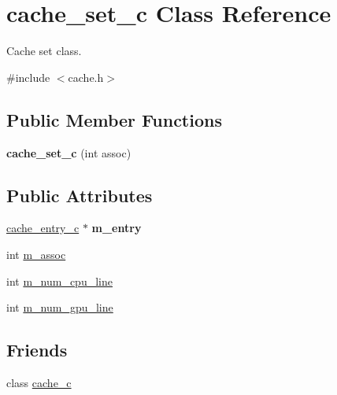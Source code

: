\hypertarget{classcache__set__c}{
\section{cache\_\-set\_\-c Class Reference}
\label{classcache__set__c}
}


Cache set class.  




{\ttfamily \#include $<$cache.h$>$}

\subsection*{Public Member Functions}
\begin{DoxyCompactItemize}
\item 
\hypertarget{classcache__set__c_a7a744e408e9da36281c3d046a1880294}{
{\bfseries cache\_\-set\_\-c} (int assoc)}
\label{classcache__set__c_a7a744e408e9da36281c3d046a1880294}

\end{DoxyCompactItemize}
\subsection*{Public Attributes}
\begin{DoxyCompactItemize}
\item 
\hypertarget{classcache__set__c_af893ec68e8ae092017390e43480d2b32}{
\hyperlink{classcache__entry__c}{cache\_\-entry\_\-c} $\ast$ {\bfseries m\_\-entry}}
\label{classcache__set__c_af893ec68e8ae092017390e43480d2b32}

\item 
int \hyperlink{classcache__set__c_ab8db54aedcbd7fb124d92232c08a07b2}{m\_\-assoc}
\item 
int \hyperlink{classcache__set__c_aeb0bbed9523176f9a3a7a7c73f6a8592}{m\_\-num\_\-cpu\_\-line}
\item 
int \hyperlink{classcache__set__c_aab7f653ba80c1a5f4c5cd35b9d816857}{m\_\-num\_\-gpu\_\-line}
\end{DoxyCompactItemize}
\subsection*{Friends}
\begin{DoxyCompactItemize}
\item 
\hypertarget{classcache__set__c_a89745fab3bfd2ba77593b8b71bb77171}{
class \hyperlink{classcache__set__c_a89745fab3bfd2ba77593b8b71bb77171}{cache\_\-c}}
\label{classcache__set__c_a89745fab3bfd2ba77593b8b71bb77171}

\end{DoxyCompactItemize}


